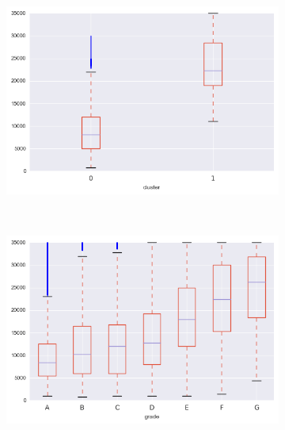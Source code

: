 \begin{anexosenv}
\begin{figure}[t!]
\begin{subfigure}[t]{0.5\textwidth}
            \centerline{\includegraphics[width=1\textwidth]{img/funded_amnt_inv_by_cluster}}
        \end{subfigure}%
        ~ 
        \begin{subfigure}[t]{0.5\textwidth}
            \centerline{\includegraphics[width=1\textwidth]{img/funded_amnt_inv_by_grade}}

        \end{subfigure}
        \\
                \caption{installment}
        \begin{subfigure}[t]{0.5\textwidth}
            \centering


\end{subfigure}
\end{figure}
\end{anexosenv}
